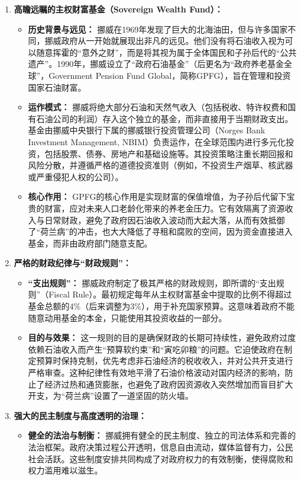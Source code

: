 \begin{enumerate}
    \item \textbf{高瞻远瞩的主权财富基金（Sovereign Wealth Fund）：}
    \begin{itemize}
        \item \textbf{历史背景与远见：} 挪威在1969年发现了巨大的北海油田，但与许多国家不同，挪威政府从一开始就展现出非凡的远见。他们没有将石油收入视为可以随意挥霍的“意外之财”，而是将其视为属于全体国民和子孙后代的“公共遗产”。1990年，挪威设立了“政府石油基金”（后更名为“政府养老基金全球”，Government Pension Fund Global，简称GPFG），旨在管理和投资国家石油财富。
        \item \textbf{运作模式：} 挪威将绝大部分石油和天然气收入（包括税收、特许权费和国有石油公司的利润）存入这个独立的基金，而非直接用于当期财政支出。基金由挪威中央银行下属的挪威银行投资管理公司（Norges Bank Investment Management, NBIM）负责运作，在全球范围内进行多元化投资，包括股票、债券、房地产和基础设施等。其投资策略注重长期回报和风险分散，并遵循严格的道德投资准则（例如，不投资生产烟草、核武器或严重侵犯人权的公司）。
        \item \textbf{核心作用：} GPFG的核心作用是实现财富的保值增值，为子孙后代留下宝贵的财富，应对未来人口老龄化带来的养老金压力。它有效隔离了资源收入与日常财政，避免了政府因石油收入波动而大起大落，从而有效抵御了“荷兰病”的冲击，也大大降低了寻租和腐败的空间，因为资金直接进入基金，而非由政府部门随意支配。
    \end{itemize}
    \item \textbf{严格的财政纪律与“财政规则”：}
    \begin{itemize}
        \item \textbf{“支出规则”：} 挪威政府制定了极其严格的财政规则，即所谓的“支出规则”（Fiscal Rule）。最初规定每年从主权财富基金中提取的比例不得超过基金总额的4\%（后来调整为3\%），用于补充国家预算。这意味着政府不能随意动用基金的本金，只能使用其投资收益的一部分。
        \item \textbf{目的与效果：} 这一规则的目的是确保财政的长期可持续性，避免政府过度依赖石油收入而产生“预算软约束”和“寅吃卯粮”的问题。它迫使政府在制定预算时保持克制，优先考虑非石油经济的税收收入，并对公共开支进行严格审查。这种纪律性有效地平滑了石油价格波动对国内经济的影响，防止了经济过热和通货膨胀，也避免了政府因资源收入突然增加而盲目扩大开支，为“荷兰病”设置了一道坚固的防火墙。
    \end{itemize}
    \item \textbf{强大的民主制度与高度透明的治理：}
    \begin{itemize}
        \item \textbf{健全的法治与制衡：} 挪威拥有健全的民主制度、独立的司法体系和完善的法治框架。政府决策过程公开透明，信息自由流动，媒体监督有力，公民社会活跃。这些制度安排共同构成了对政府权力的有效制衡，使得腐败和权力滥用难以滋生。

\end{itemize}
\end{enumerate}

